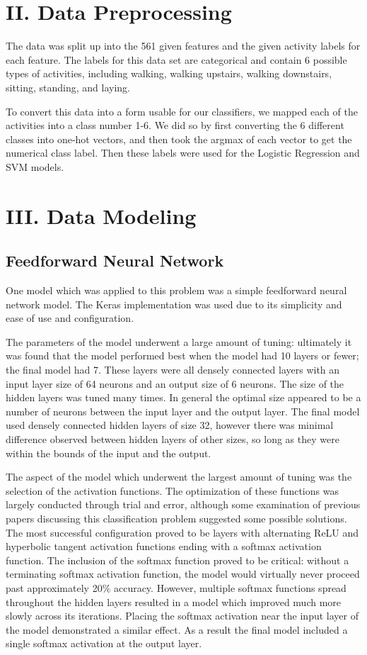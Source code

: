 \documentclass[12pt]{article}
\begin{document}
\section*{II. Data Preprocessing}
 	The data was split up into the 561 given features and the given activity labels for each feature. The labels for this data set are categorical and contain 6 possible types of activities, including walking, walking upstairs, walking downstairs, sitting, standing, and laying. 
 	
   \newline \newline To convert this data into a form usable for our classifiers, we mapped each of the activities into a class number 1-6. We did so by first converting the 6 different classes into one-hot vectors, and then took the argmax of each vector to get the numerical class label. Then these labels were used for the Logistic Regression and SVM models.
   
\section*{III. Data Modeling}
\subsection*{Feedforward Neural Network}
One model which was applied to this problem was a simple feedforward neural network model. The Keras implementation was used due to its simplicity and ease of use and configuration.

The parameters of the model underwent a large amount of tuning: ultimately it was found that the model performed best when the model had 10 layers or fewer; the final model had 7. These layers were all densely connected layers with an input layer size of 64 neurons and an output size of 6 neurons. The size of the hidden layers was tuned many times. In general the optimal size appeared to be a number of neurons between the input layer and the output layer. The final model used densely connected hidden layers of size 32, however there was minimal difference observed between hidden layers of other sizes, so long as they were within the bounds of the input and the output.

The aspect of the model which underwent the largest amount of tuning was the selection of the activation functions. The optimization of these functions was largely conducted through trial and error, although some examination of previous papers discussing this classification problem suggested some possible solutions. The most successful configuration proved to be layers with alternating ReLU and hyperbolic tangent activation functions ending with a softmax activation function. The inclusion of the softmax function proved to be critical: without a terminating softmax activation function, the model would virtually never proceed past approximately 20\% accuracy. However, multiple softmax functions spread throughout the hidden layers resulted in a model which improved much more slowly across its iterations. Placing the softmax activation near the input layer of the model demonstrated a similar effect. As a result the final model included a single softmax activation at the output layer.
\end{document}
